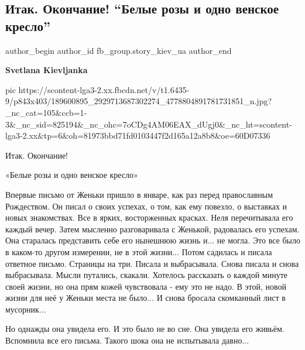  
 
 
 
 
 
\subsection{Итак. Окончание! \enquote{Белые розы и одно венское кресло}}
\label{sec:22_05_2021.fb.fb_group.story_kiev_ua.1.belye_rozy_okonchanie}
\ifcmt
 author_begin
   author_id fb_group.story_kiev_ua
 author_end
\fi

\textbf{Svetlana Kievljanka}


\ifcmt
  pic https://scontent-lga3-2.xx.fbcdn.net/v/t1.6435-9/p843x403/189600895_2929713687302274_4778804891781731851_n.jpg?_nc_cat=105&ccb=1-3&_nc_sid=825194&_nc_ohc=7oCDg4AM06EAX_dUgj0&_nc_ht=scontent-lga3-2.xx&tp=6&oh=81973bbd71fd0103447f2d165a12a8b8&oe=60D07336
\fi

Итак. Окончание! 

«Белые розы и одно венское кресло»

Впервые письмо от Женьки пришло в январе, как раз перед православным
Рождеством. Он писал о своих успехах, о том, как ему повезло, о выставках и новых
знакомствах. Все в ярких, восторженных красках. Неля перечитывала его каждый
вечер. Затем мысленно разговаривала с Женькой, радовалась его успехам. Она
старалась представить себе его нынешнюю жизнь и... не могла. Это все было в
каком-то другом измерении, не в этой жизни... Потом садилась и писала ответное
письмо. Страницы на три. Писала и выбрасывала. Снова писала и снова
выбрасывала. Мысли путались, скакали. Хотелось рассказать о каждой минуте своей
жизни, но она прям кожей чувствовала - ему это не надо. В этой, новой жизни для
неё у Женьки места не было... И снова бросала скомканный лист в мусорник...

Но однажды она увидела его. И это было не во сне. Она увидела его живьём.
Вспомнила все его письма. Такого шока она не испытывала давно...

